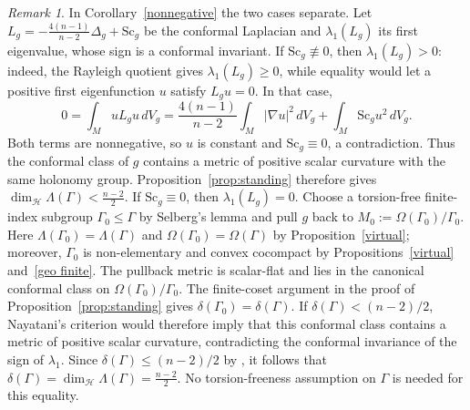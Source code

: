 \documentclass[12pt,oneside,a4paper]{article}
\theoremstyle{mytheorem}
\theoremstyle{remark}
\newtheorem{remark}[definition]{Remark}
\theoremstyle{definition}
\begin{document}
\begin{remark}
In Corollary~\ref{nonnegative} the two cases separate. Let
$L_g=-\frac{4(n-1)}{n-2}\Delta_g+\mathrm{Sc}_g$ be the conformal
Laplacian and $\lambda_1(L_g)$ its first eigenvalue, whose sign is a conformal
invariant. If $\mathrm{Sc}_g\not\equiv0$, then
$\lambda_1(L_g)>0$: indeed, the Rayleigh quotient gives
$\lambda_1(L_g)\geq0$, while equality would let a positive first eigenfunction
$u$ satisfy $L_gu=0$. In that case,
\[
0=\int_MuL_gu\,dV_g
=\frac{4(n-1)}{n-2}\int_M|\nabla u|^2\,dV_g
 +\int_M\mathrm{Sc}_g u^2\,dV_g.
\]
Both terms are nonnegative, so $u$ is constant and
$\mathrm{Sc}_g\equiv0$, a contradiction. Thus the conformal
class of $g$ contains a metric of positive scalar curvature with the same
holonomy group. Proposition~\ref{prop:standing} therefore gives
$\dim_{\mathcal H}\Lambda(\Gamma)<\frac{n-2}{2}$.
If $\mathrm{Sc}_g\equiv0$, then $\lambda_1(L_g)=0$. Choose a
torsion-free finite-index subgroup $\Gamma_0\leq\Gamma$ by Selberg's lemma and
pull $g$ back to $M_0:=\Omega(\Gamma_0)/\Gamma_0$.
Here $\Lambda(\Gamma_0)=\Lambda(\Gamma)$ and
$\Omega(\Gamma_0)=\Omega(\Gamma)$ by Proposition~\ref{virtual}; moreover,
$\Gamma_0$ is non-elementary and convex cocompact by
Propositions~\ref{virtual} and~\ref{geo finite}. The pullback metric is
scalar-flat and lies in the canonical conformal class on
$\Omega(\Gamma_0)/\Gamma_0$. The finite-coset argument in the proof of
Proposition~\ref{prop:standing} gives
$\delta(\Gamma_0)=\delta(\Gamma)$. If
$\delta(\Gamma)<(n-2)/2$, Nayatani's criterion
\cite[Corollary~3.4]{zbMATH01028179} would therefore imply that this conformal
class contains a metric of positive scalar curvature, contradicting the
conformal invariance of the sign of $\lambda_1$. Since
$\delta(\Gamma)\leq(n-2)/2$ by \cite[Theorem~4]{zbMATH01785298}, it follows
that
$\delta(\Gamma)=\dim_{\mathcal H}\Lambda(\Gamma)=\frac{n-2}{2}$.
No torsion-freeness assumption on $\Gamma$ is needed for this equality.
\end{remark}
\end{document}
